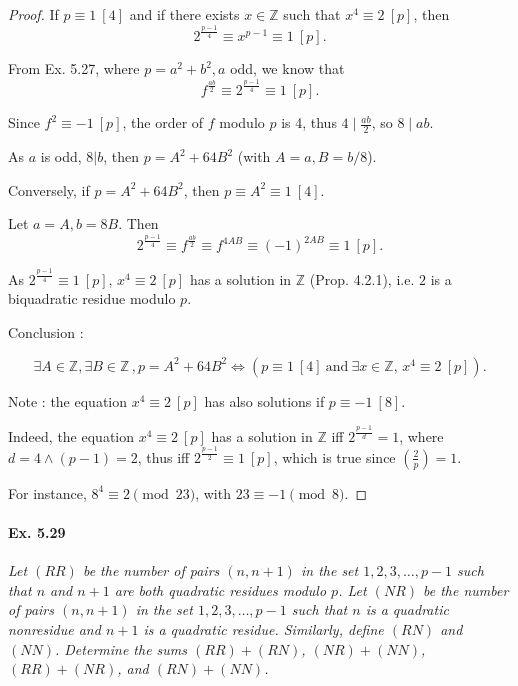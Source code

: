 \documentclass[11pt,a4paper]{article}
\newcommand{\Z}{\mathbb{Z}}
\newcommand{\legendre}[2]{\genfrac{(}{)}{}{}{#1}{#2}}
\begin{document}
\begin{proof}
If  $p\equiv 1\ [4]$ and if there exists $x \in \mathbb{Z}$ such that $x^4 \equiv 2\ [p]$, then
$$2^{\frac{p-1}{4} }\equiv  x^{p-1} \equiv 1 \ [p].$$ 

From Ex. 5.27, where $p = a^2 +b^2, a$ odd,  we know that $$f^{\frac{ab}{2}} \equiv 2^{\frac{p-1}{4} } \equiv 1 \ [p].$$

Since $f^2 \equiv -1\ [p]$, the order of $f$ modulo $p$ is 4, thus $4 \mid \frac{ab}{2}$, so $8\mid ab$.

As $a$ is odd, $8 | b$, then $p = A^2 + 64 B^2$ (with $A = a, B = b/8$).

\bigskip

Conversely, if $p=A^2+64 B^2$, then $p\equiv A^2 \equiv 1 \ [4]$.

Let $a=A,b=8B$. Then $$2^{\frac{p-1}{4} } \equiv f^{\frac{ab}{2}} \equiv f^{4AB} \equiv (-1)^{2AB} \equiv 1 \ [p].$$

As $2^{\frac{p-1}{4} } \equiv 1 \ [p]$, $x^4 \equiv 2 \ [p]$ has a solution in $\Z$ (Prop. 4.2.1), i.e. $2$ is a biquadratic residue modulo $p$.

Conclusion : 

$$\exists A \in \mathbb{Z}, \exists B \in \mathbb{Z}\,, p = A^2+64 B^2 \iff( p\equiv 1 \ [4] \ \mathrm{and} \ \exists x \in \mathbb{Z}, \, x^4 \equiv 2 \ [p]).$$

\vspace{0.5cm}
Note  : the equation $x^4 \equiv 2\ [p]$ has also solutions if $p \equiv -1 \ [8]$.

Indeed, the equation $x^4 \equiv 2 \ [p]$ has a solution in $\Z$  iff $2^{\frac{p-1}{d}} = 1$, where $d = 4 \wedge (p-1) = 2$, thus  iff $2^{\frac{p-1}{2}} \equiv 1 \ [p]$, which is true since $\legendre{2}{p}=1$.

For instance, $8^4 \equiv 2 \pmod {23}$, with $23\equiv -1 \pmod 8$.
\end{proof}

\paragraph{Ex. 5.29}

{\it Let $(RR)$ be the number of pairs $(n, n + 1)$ in the set $1,2,3,\ldots, p - 1$ such that $n$ and $n + 1$ are both quadratic residues modulo $p$. Let $(NR)$ be the number of pairs $(n, n + 1)$ in the set $1,2,3, \ldots, p - 1$ such that $n$ is a quadratic nonresidue and $n + 1$ is a quadratic residue. Similarly, define $(RN)$ and $(NN)$. Determine the sums $(RR) + (RN)$, $(NR) + (NN)$, $(RR) + (NR)$, and $(RN) + (NN)$.
}
\end{document}
